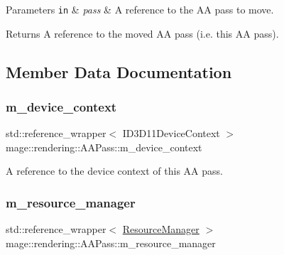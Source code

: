 \begin{DoxyParams}[1]{Parameters}
\mbox{\tt in}  & {\em pass} & A reference to the AA pass to move. \\
\hline
\end{DoxyParams}
\begin{DoxyReturn}{Returns}
A reference to the moved AA pass (i.\+e. this AA pass). 
\end{DoxyReturn}


\subsection{Member Data Documentation}
\mbox{\label{classmage_1_1rendering_1_1_a_a_pass_ae5421af4d2de6128ae24f4c6d5179c81}} 
\subsubsection{\texorpdfstring{m\+\_\+device\+\_\+context}{m\_device\_context}}
{\footnotesize\ttfamily std\+::reference\+\_\+wrapper$<$ I\+D3\+D11\+Device\+Context $>$ mage\+::rendering\+::\+A\+A\+Pass\+::m\+\_\+device\+\_\+context\hspace{0.3cm}{\ttfamily [private]}}

A reference to the device context of this AA pass. \mbox{\label{classmage_1_1rendering_1_1_a_a_pass_aaffba9ba685e4723220a6c04834f6d2f}} 
\subsubsection{\texorpdfstring{m\+\_\+resource\+\_\+manager}{m\_resource\_manager}}
{\footnotesize\ttfamily std\+::reference\+\_\+wrapper$<$ \mbox{\hyperlink{classmage_1_1rendering_1_1_resource_manager}{Resource\+Manager}} $>$ mage\+::rendering\+::\+A\+A\+Pass\+::m\+\_\+resource\+\_\+manager\hspace{0.3cm}{\ttfamily [private]}}


